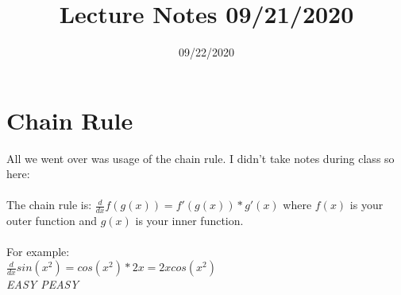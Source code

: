 \documentclass{article}
\begin{document}
\title{Lecture Notes 09/21/2020}
\date{09/22/2020}
\maketitle

\section{Chain Rule}
All we went over was usage of the chain rule. I didn't take notes during class so here:\\
\\
The chain rule is: $\frac{d}{dx}f(g(x)) = f'(g(x)) * g'(x)$ where $f(x)$ is your outer function and $g(x)$ is your inner function.\\
\\
For example:\\
$\frac{d}{dx} sin(x^2) = cos(x^2) * 2x = 2xcos(x^2)$\\
\textit{EASY PEASY}
\end{document}
